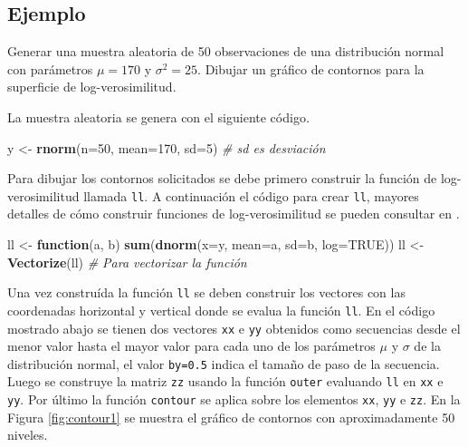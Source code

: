 \documentclass[10pt,]{krantz}
\makeatletter
\newenvironment{Shaded}{\begin{snugshade}}{\end{snugshade}}
\newcommand{\KeywordTok}[1]{\textcolor[rgb]{0.13,0.29,0.53}{\textbf{#1}}}
\newcommand{\DataTypeTok}[1]{\textcolor[rgb]{0.13,0.29,0.53}{#1}}
\newcommand{\DecValTok}[1]{\textcolor[rgb]{0.00,0.00,0.81}{#1}}
\newcommand{\StringTok}[1]{\textcolor[rgb]{0.31,0.60,0.02}{#1}}
\newcommand{\CommentTok}[1]{\textcolor[rgb]{0.56,0.35,0.01}{\textit{#1}}}
\newcommand{\OtherTok}[1]{\textcolor[rgb]{0.56,0.35,0.01}{#1}}
\newcommand{\ControlFlowTok}[1]{\textcolor[rgb]{0.13,0.29,0.53}{\textbf{#1}}}
\newcommand{\NormalTok}[1]{#1}
\newenvironment{kframe}{%
\medskip{}
\setlength{\fboxsep}{.8em}
 \def\at@end@of@kframe{}%
 \ifinner\ifhmode%
  \def\at@end@of@kframe{\end{minipage}}%
  \begin{minipage}{\columnwidth}%
 \fi\fi%
 \def\FrameCommand##1{\hskip\@totalleftmargin \hskip-\fboxsep
 \colorbox{shadecolor}{##1}\hskip-\fboxsep
     \hskip-\linewidth \hskip-\@totalleftmargin \hskip\columnwidth}%
 \MakeFramed {\advance\hsize-\width
   \@totalleftmargin\z@ \linewidth\hsize
   \@setminipage}}%
 {\par\unskip\endMakeFramed%
 \at@end@of@kframe}
\renewenvironment{Shaded}{\begin{kframe}}{\end{kframe}}
\makeatother
\begin{document}
\subsection*{Ejemplo}\label{ejemplo-21}


Generar una muestra aleatoria de 50 observaciones de una distribución
normal con parámetros \(\mu=170\) y \(\sigma^2=25\). Dibujar un gráfico
de contornos para la superficie de log-verosimilitud.

La muestra aleatoria se genera con el siguiente código.

\begin{Shaded}
\begin{Highlighting}[]
\NormalTok{y <-}\StringTok{ }\KeywordTok{rnorm}\NormalTok{(}\DataTypeTok{n=}\DecValTok{50}\NormalTok{, }\DataTypeTok{mean=}\DecValTok{170}\NormalTok{, }\DataTypeTok{sd=}\DecValTok{5}\NormalTok{)  }\CommentTok{# sd es desviación}
\end{Highlighting}
\end{Shaded}

Para dibujar los contornos solicitados se debe primero construir la
función de log-verosimilitud llamada \texttt{ll}. A continuación el
código para crear \texttt{ll}, mayores detalles de cómo construir
funciones de log-verosimilitud se pueden consultar en
\citet{hernandez_usuga}.

\begin{Shaded}
\begin{Highlighting}[]
\NormalTok{ll <-}\StringTok{ }\ControlFlowTok{function}\NormalTok{(a, b) }\KeywordTok{sum}\NormalTok{(}\KeywordTok{dnorm}\NormalTok{(}\DataTypeTok{x=}\NormalTok{y, }\DataTypeTok{mean=}\NormalTok{a, }\DataTypeTok{sd=}\NormalTok{b, }\DataTypeTok{log=}\OtherTok{TRUE}\NormalTok{))}
\NormalTok{ll <-}\StringTok{ }\KeywordTok{Vectorize}\NormalTok{(ll)  }\CommentTok{# Para vectorizar la función}
\end{Highlighting}
\end{Shaded}

Una vez construída la función \texttt{ll} se deben construir los
vectores con las coordenadas horizontal y vertical donde se evalua la
función \texttt{ll}. En el código mostrado abajo se tienen dos vectores
\texttt{xx} e \texttt{yy} obtenidos como secuencias desde el menor valor
hasta el mayor valor para cada uno de los parámetros \(\mu\) y
\(\sigma\) de la distribución normal, el valor \texttt{by=0.5} indica el
tamaño de paso de la secuencia. Luego se construye la matriz \texttt{zz}
usando la función \texttt{outer} evaluando \texttt{ll} en \texttt{xx} e
\texttt{yy}. Por último la función \texttt{contour} se aplica sobre los
elementos \texttt{xx}, \texttt{yy} e \texttt{zz}. En la Figura
\ref{fig:contour1} se muestra el gráfico de contornos con
aproximadamente 50 niveles.
\end{document}
